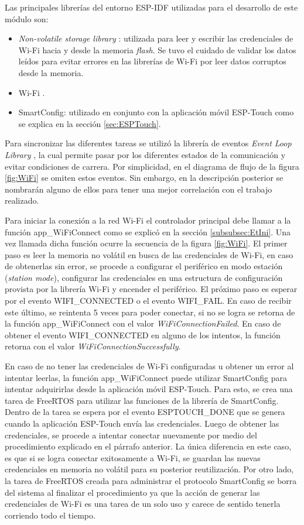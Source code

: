 Las principales librerías del entorno ESP-IDF utilizadas para el desarrollo de este módulo son: 
\begin{itemize}
\item \textit{Non-volatile storage library} \citep{NVL}: utilizada para leer y escribir las credenciales de Wi-Fi hacia y desde la memoria \textit{flash}. Se tuvo el cuidado de validar los datos leídos para evitar errores en las librerías de Wi-Fi por leer datos corruptos desde la memoria.
\item Wi-Fi \citep{ESPIDF:WiFi}.
\item SmartConfig: utilizado en conjunto con la aplicación móvil ESP-Touch como se explica en la sección \ref{sec:ESPTouch}.
\end{itemize}

Para sincronizar las diferentes tareas se utilizó la librería de eventos \textit{Event Loop Library} \citep{EVENT}, la cual permite pasar por los diferentes estados de la comunicación y evitar condiciones de carrera. Por simplicidad, en el diagrama de flujo de la figura \ref{fig:WiFi} se omiten estos eventos. Sin embargo, en la descripción posterior se nombrarán alguno de ellos para tener una mejor correlación con el trabajo realizado.

Para iniciar la conexión a la red Wi-Fi el controlador principal debe llamar a la función app\_WiFiConnect como se explicó en la sección \ref{subsubsec:EtIni}. Una vez llamada dicha función ocurre la secuencia de la figura \ref{fig:WiFi}. El primer paso es leer la memoria no volátil en busca de las credenciales de Wi-Fi, en caso de obtenerlas sin error, se procede a configurar el periférico en modo estación (\textit{station mode}), configurar las credenciales en una estructura de configuración provista por la librería Wi-Fi y encender el periférico. El próximo paso es esperar por el evento WIFI\_CONNECTED o el evento WIFI\_FAIL. En caso de recibir este último, se reintenta 5 veces para poder conectar, si no se logra se retorna de la función app\_WiFiConnect con el valor \textit{WiFiConnectionFailed}. En caso de obtener el evento  WIFI\_CONNECTED en alguno de los intentos, la función retorna con el valor \textit{WiFiConnectionSuccessfully}.

En caso de no tener las credenciales de Wi-Fi configuradas u obtener un error al intentar leerlas, la función app\_WiFiConnect puede utilizar SmartConfig para intentar adquirirlas desde la aplicación móvil ESP-Touch. Para esto, se crea una tarea de FreeRTOS para utilizar las funciones de la librería de SmartConfig. Dentro de la tarea se espera por el evento ESPTOUCH\_DONE que se genera cuando la aplicación ESP-Touch envía las credenciales. Luego de obtener las credenciales, se procede a intentar conectar nuevamente por medio del procedimiento explicado en el párrafo anterior. La única diferencia en este caso, es que si se logra conectar exitosamente a Wi-Fi, se guardan las nuevas credenciales en memoria no volátil para su posterior reutilización. Por otro lado, la tarea de FreeRTOS creada para administrar el protocolo SmartConfig se borra del sistema al finalizar el procedimiento ya que la acción de generar las credenciales de Wi-Fi es una tarea de un solo uso y carece de sentido tenerla corriendo todo el tiempo.


